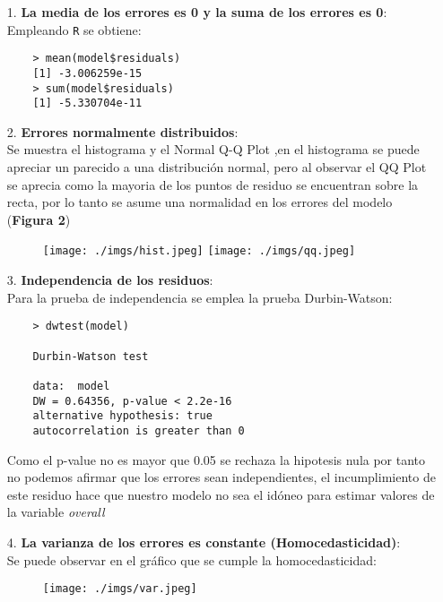 \documentclass[a4paper,10pt,twocolumn]{article}
\begin{document}
\begin{enumerate}
	\item[1.] \textbf{La media de los errores es 0 y la suma de los errores es 0}:\\
	Empleando \verb|R| se obtiene:
	\begin{verbatim}
	> mean(model$residuals)
	[1] -3.006259e-15
	> sum(model$residuals)
	[1] -5.330704e-11
	\end{verbatim}
	
	\item[2.] \textbf{Errores normalmente distribuidos}:\\
	Se muestra el histograma y el Normal Q-Q Plot ,en el histograma se puede apreciar un parecido a una distribuci\'on normal, pero al observar el QQ Plot se aprecia como la mayoria de los puntos de residuo se encuentran sobre la recta, por lo tanto se asume una normalidad en los errores del modelo (\textbf{Figura 2})
	
	\begin{figure}[h]
		\texttt{[image: ./imgs/hist.jpeg]}
		\texttt{[image: ./imgs/qq.jpeg]}
		\caption{}
	\end{figure}
	
	\item [3.] \textbf{Independencia de los residuos}:\\
	Para la prueba de independencia se emplea la prueba Durbin-Watson:
	
	\begin{verbatim}
	> dwtest(model)
	
	Durbin-Watson test
	
	data:  model
	DW = 0.64356, p-value < 2.2e-16
	alternative hypothesis: true 
	autocorrelation is greater than 0
	\end{verbatim}
	
	Como el p-value no es mayor que 0.05 se rechaza la hipotesis nula por tanto no podemos afirmar que los errores sean independientes, el incumplimiento de este residuo hace que nuestro modelo no sea el id\'oneo para estimar valores de la variable \textit{overall}
	
	\item[4.] \textbf{La varianza de los errores es constante (Homocedasticidad)}:\\
	
	Se puede observar en el gr\'afico que se cumple la homocedasticidad:
	
	\begin{figure}[h]
		\texttt{[image: ./imgs/var.jpeg]}
	\end{figure}

\end{enumerate}
\end{document}
